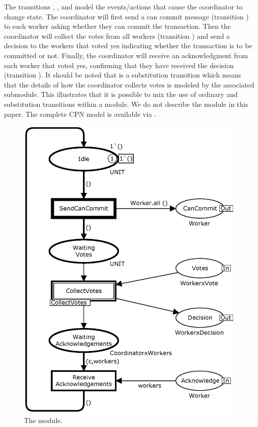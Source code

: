The transitions , , and
 model the events/actions that cause
the coordinator to change state. The coordinator will first send a can
commit message (transition ) to each worker
asking whether they can commit the transaction. Then the coordinator
will collect the votes from all workers (transition
) and send a decision to the workers that voted
yes indicating whether the transaction is to be committed or
not. Finally, the coordinator will receive an acknowledgment from each
worker that voted yes, confirming that they have received the decision
(transition ).  It should be noted
that  is a substitution transition which means
that the details of how the coordinator collects votes is modeled by
the associated  submodule. This illustrates that
it is possible to mix the use of ordinary and substitution transitions
within a module. We do not describe the  module
in this paper. The complete CPN model is available via \cite{cpnmodel}.

\begin{figure}[]
\centering
\includegraphics[scale=.5]{figures/Coordinator.eps}
\caption{The  module.}
\label{fig:coordinator}
\end{figure}


